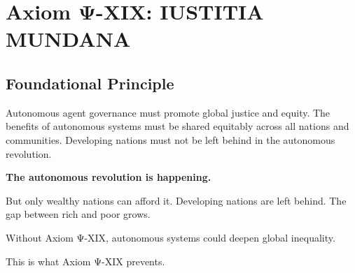 

\chapter{Axiom Ψ-XIX: IUSTITIA MUNDANA}
\label{ch:axiom-XIX}

\section*{Foundational Principle}

\begin{principlebox}
Autonomous agent governance must promote global justice and equity. The benefits of autonomous systems must be shared equitably across all nations and communities. Developing nations must not be left behind in the autonomous revolution.
\end{principlebox}

\vspace{0.5cm}

\begin{tcolorbox}[colback=lightgray, colframe=legislativeblue, title=\textbf{📖 Why This Axiom Matters}]
\textbf{The autonomous revolution is happening.}

But only wealthy nations can afford it. Developing nations are left behind. The gap between rich and poor grows.

Without Axiom Ψ-XIX, autonomous systems could deepen global inequality.

This is what Axiom Ψ-XIX prevents.
\end{tcolorbox}

\vspace{0.5cm}

